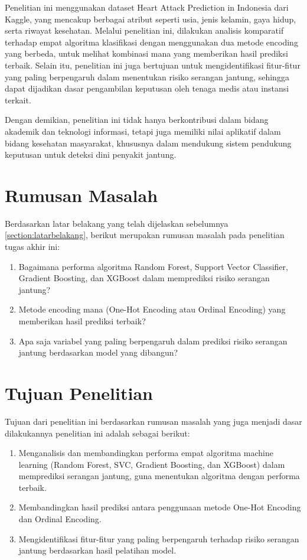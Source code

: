 Penelitian ini menggunakan dataset Heart Attack Prediction in Indonesia dari Kaggle, yang mencakup berbagai atribut seperti usia, jenis kelamin, gaya hidup, serta riwayat kesehatan. Melalui penelitian ini, dilakukan analisis komparatif terhadap empat algoritma klasifikasi dengan menggunakan dua metode encoding yang berbeda, untuk melihat kombinasi mana yang memberikan hasil prediksi terbaik. Selain itu, penelitian ini juga bertujuan untuk mengidentifikasi fitur-fitur yang paling berpengaruh dalam menentukan risiko serangan jantung, sehingga dapat dijadikan dasar pengambilan keputusan oleh tenaga medis atau instansi terkait.

Dengan demikian, penelitian ini tidak hanya berkontribusi dalam bidang akademik dan teknologi informasi, tetapi juga memiliki nilai aplikatif dalam bidang kesehatan masyarakat, khususnya dalam mendukung sistem pendukung keputusan untuk deteksi dini penyakit jantung.

\section{Rumusan Masalah}
Berdasarkan latar belakang yang telah dijelaskan sebelumnya \ref{section:latarbelakang}, berikut merupakan rumusan masalah pada penelitian tugas akhir ini:
\begin{enumerate}
    \item Bagaimana performa algoritma Random Forest, Support Vector Classifier, Gradient Boosting, dan XGBoost dalam memprediksi risiko serangan jantung?
    \item Metode encoding mana (One-Hot Encoding atau Ordinal Encoding) yang memberikan hasil prediksi terbaik?
    \item Apa saja variabel yang paling berpengaruh dalam prediksi risiko serangan jantung berdasarkan model yang dibangun?
\end{enumerate}

\section{Tujuan Penelitian}
Tujuan dari penelitian ini berdasarkan rumusan masalah yang juga menjadi dasar dilakukannya penelitian ini adalah sebagai berikut:
\begin{enumerate}
    \item Menganalisis dan membandingkan performa empat algoritma machine learning (Random Forest, SVC, Gradient Boosting, dan XGBoost) dalam memprediksi serangan jantung, guna menentukan algoritma dengan performa terbaik.
    \item Membandingkan hasil prediksi antara penggunaan metode One-Hot Encoding dan Ordinal Encoding.
    \item Mengidentifikasi fitur-fitur yang paling berpengaruh terhadap risiko serangan jantung berdasarkan hasil pelatihan model.
\end{enumerate}


